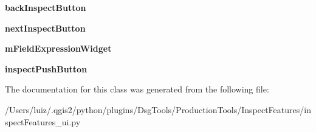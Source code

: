 \begin{DoxyCompactItemize}
{\bfseries back\+Inspect\+Button}
\item 
\mbox{\label{class_dsg_tools_1_1_production_tools_1_1_inspect_features_1_1inspect_features__ui_1_1_ui___form_a0590d594b0b1f8f4ba7e0f0c70baa312}} 
{\bfseries next\+Inspect\+Button}
\item 
\mbox{\label{class_dsg_tools_1_1_production_tools_1_1_inspect_features_1_1inspect_features__ui_1_1_ui___form_af2c3a4844fd9edbe70dc654fb973c401}} 
{\bfseries m\+Field\+Expression\+Widget}
\item 
\mbox{\label{class_dsg_tools_1_1_production_tools_1_1_inspect_features_1_1inspect_features__ui_1_1_ui___form_ad9281ff3ea4af917f1f747c6153f2552}} 
{\bfseries inspect\+Push\+Button}
\end{DoxyCompactItemize}


The documentation for this class was generated from the following file\+:\begin{DoxyCompactItemize}
\item 
/\+Users/luiz/.\+qgis2/python/plugins/\+Dsg\+Tools/\+Production\+Tools/\+Inspect\+Features/inspect\+Features\+\_\+ui.\+py\end{DoxyCompactItemize}
